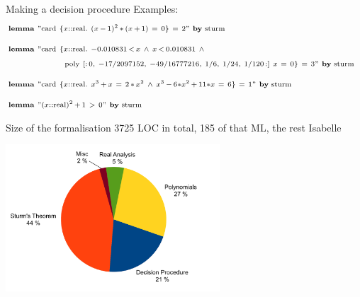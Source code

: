 \documentclass[%
	sans,			%
	mathsans,		%
	10pt,
	t		%
	slidescentered,%
]{beamer}
\newcommand{\lem}{\textbf{lemma}}
\newcommand{\card}{\textrm{card}}
\newcommand{\real}{\textrm{real}}
\begin{document}
\begin{frame}{\hskip-2mm Making a decision procedure}
\hskip-2mm Examples:
\begin{align*}
&\hskip-2mm\scriptstyle
\lem\ "\card\ \{x::\real.\ (x\, -\, 1)^2\, *\, (x\, +\, 1)\ =\ 0\}\ =\ 2"\ \textrm{\textbf{by}\ sturm}\\[2mm]
&\hskip-2mm\scriptstyle\textbf{lemma}\ "\mathrm{card}\ \{x::\mathrm{real}.\ -0.010831\, <\, x\ \wedge\ x\, <\, 0.010831\ \wedge\\
&\hskip-2mm\scriptstyle\hskip20mm \mathrm{poly}\ [:\,0,\  -17/2097152,\  -49/16777216,\  1/6,\  1/24,\  1/120\,:]\ x\ =\ 0\}\  =\  3"\ \textrm{\textbf{by}\ sturm}\\[2mm]
&\hskip-2mm\scriptstyle\lem\ "\card\ \{x::\real.\ x^3\, +\, x\ =\ 2\,*\,x^2\ \wedge\ x^3\,-\,6*x^2\,+\,11*x\ =\ 6\}\  =\  1"\ \textrm{\textbf{by}\ sturm}\\[2mm]
&\hskip-2mm\scriptstyle\lem\ "(x::\real)^2\,+\,1\ >\ 0"\ \textrm{\textbf{by}\ sturm}
\end{align*}
\end{frame}

\begin{frame}{Size of the formalisation}
3725 LOC in total, 185 of that ML, the rest Isabelle
\begin{center}
\includegraphics[width=8cm]{plot.pdf}
\end{center}
\end{frame}
\end{document}
